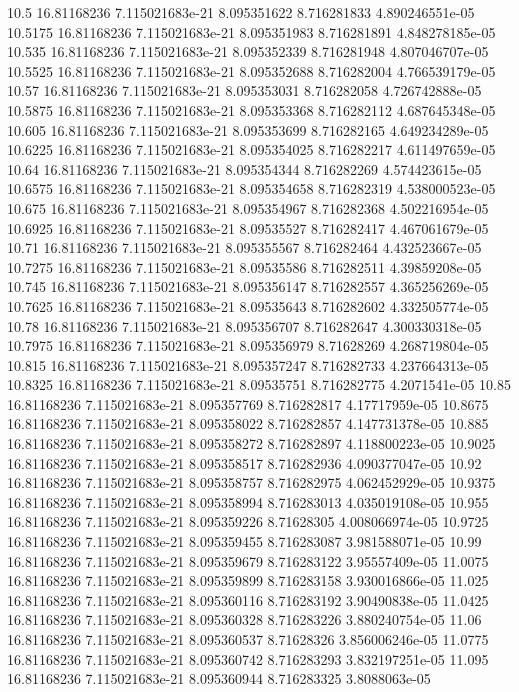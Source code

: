 {10.5 16.81168236 7.115021683e-21 8.095351622 8.716281833 4.890246551e-05
10.5175 16.81168236 7.115021683e-21 8.095351983 8.716281891 4.848278185e-05
10.535 16.81168236 7.115021683e-21 8.095352339 8.716281948 4.807046707e-05
10.5525 16.81168236 7.115021683e-21 8.095352688 8.716282004 4.766539179e-05
10.57 16.81168236 7.115021683e-21 8.095353031 8.716282058 4.726742888e-05
10.5875 16.81168236 7.115021683e-21 8.095353368 8.716282112 4.687645348e-05
10.605 16.81168236 7.115021683e-21 8.095353699 8.716282165 4.649234289e-05
10.6225 16.81168236 7.115021683e-21 8.095354025 8.716282217 4.611497659e-05
10.64 16.81168236 7.115021683e-21 8.095354344 8.716282269 4.574423615e-05
10.6575 16.81168236 7.115021683e-21 8.095354658 8.716282319 4.538000523e-05
10.675 16.81168236 7.115021683e-21 8.095354967 8.716282368 4.502216954e-05
10.6925 16.81168236 7.115021683e-21 8.09535527 8.716282417 4.467061679e-05
10.71 16.81168236 7.115021683e-21 8.095355567 8.716282464 4.432523667e-05
10.7275 16.81168236 7.115021683e-21 8.09535586 8.716282511 4.39859208e-05
10.745 16.81168236 7.115021683e-21 8.095356147 8.716282557 4.365256269e-05
10.7625 16.81168236 7.115021683e-21 8.09535643 8.716282602 4.332505774e-05
10.78 16.81168236 7.115021683e-21 8.095356707 8.716282647 4.300330318e-05
10.7975 16.81168236 7.115021683e-21 8.095356979 8.71628269 4.268719804e-05
10.815 16.81168236 7.115021683e-21 8.095357247 8.716282733 4.237664313e-05
10.8325 16.81168236 7.115021683e-21 8.09535751 8.716282775 4.2071541e-05
10.85 16.81168236 7.115021683e-21 8.095357769 8.716282817 4.17717959e-05
10.8675 16.81168236 7.115021683e-21 8.095358022 8.716282857 4.147731378e-05
10.885 16.81168236 7.115021683e-21 8.095358272 8.716282897 4.118800223e-05
10.9025 16.81168236 7.115021683e-21 8.095358517 8.716282936 4.090377047e-05
10.92 16.81168236 7.115021683e-21 8.095358757 8.716282975 4.062452929e-05
10.9375 16.81168236 7.115021683e-21 8.095358994 8.716283013 4.035019108e-05
10.955 16.81168236 7.115021683e-21 8.095359226 8.71628305 4.008066974e-05
10.9725 16.81168236 7.115021683e-21 8.095359455 8.716283087 3.981588071e-05
10.99 16.81168236 7.115021683e-21 8.095359679 8.716283122 3.95557409e-05
11.0075 16.81168236 7.115021683e-21 8.095359899 8.716283158 3.930016866e-05
11.025 16.81168236 7.115021683e-21 8.095360116 8.716283192 3.90490838e-05
11.0425 16.81168236 7.115021683e-21 8.095360328 8.716283226 3.880240754e-05
11.06 16.81168236 7.115021683e-21 8.095360537 8.71628326 3.856006246e-05
11.0775 16.81168236 7.115021683e-21 8.095360742 8.716283293 3.832197251e-05
11.095 16.81168236 7.115021683e-21 8.095360944 8.716283325 3.8088063e-05
}
